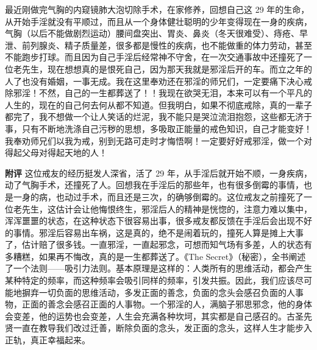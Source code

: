 \begin{case}
    最近刚做完气胸的内窥镜肺大泡切除手术，在家修养，回想自己这 29 年的生命，从开始手淫就没有平顺过，而且从一个身体健壮聪明的少年变得现在一身的疾病，气胸（以后不能做剧烈运动）腰间盘突出、胃炎、鼻炎（冬天很难受）、痔疮、早泄、前列腺炎、精子质量差，很多都是慢性的疾病，也不能做重的体力劳动，甚至不能跑步打球。而且因为自己手淫后经常神不守舍，在一次交通事故中还撞死了一位老先生，现在想想真的是恨死自己，因为那天我就是邪淫后开的车。而立之年的人了也没有婚姻，一事无成。我在这里奉劝还在邪淫的师兄们，一定要痛下决心戒除邪淫！不然，自己的一生都葬送了！！我现在欲哭无泪，本来可以有一个平凡的人生的，现在的自己何去何从都不知道。但我明白，如果不彻底戒除，真的一辈子都完了，我不想做一个让人笑话的烂泥，我不能只是哭泣流泪抱怨，这些都无济于事，只有不断地洗涤自己污秽的思想，多吸取正能量的戒色知识，自己才能变好！我奉劝师兄们以我为戒，别到无路可走时才悔悟啊！一定要好好戒邪淫，做一个对得起父母对得起天地的人！

    \textbf{附评} 这位戒友的经历挺发人深省，活了 29 年，从手淫后就开始不顺，一身疾病，动了气胸手术，还撞死了人。回想我在手淫后的那些年，也有很多倒霉的事情，也是一身的病，也动过手术，而且还是三次，的确够倒霉的。这位戒友之前撞死了一位老先生，这估计会让他悔恨终生，邪淫后人的精神是恍惚的，注意力难以集中，浑浑噩噩的状态，在这种状态下很容易出事，很多戒友都反馈在手淫后会出现不好的事情。邪淫后容易出车祸，这是真的，绝不是闹着玩的，撞死人算是摊上大事了，估计赔了很多钱。一直邪淫，一直起邪念，可想而知气场有多差，人的状态有多糟糕，如果再不悔改，真的是一生都葬送了。《The Secret》（秘密），全书阐述了一个法则——吸引力法则。基本原理是这样的：人类所有的思维活动，都会产生某种特定的频率，而这种频率会吸引同样的频率，引发共振。因此，我们应该尽可能地摒弃一切负面的思维活动，多发正面的善念，负面的念头会感召负面的人事物，正面的善念会感召正面的人事物。一个邪淫的人，满脑子邪思邪念，他的身体会变差，他的运势也会变差，人生会充满各种坎坷，其实都是自己感召的。古圣先贤一直在教导我们改过迁善，断除负面的念头，发正面的念头，这样人生才能步入正轨，真正幸福起来。
\end{case}

